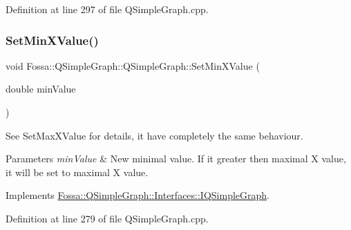 Definition at line 297 of file Q\+Simple\+Graph.\+cpp.

\mbox{\label{class_fossa_1_1_q_simple_graph_1_1_q_simple_graph_a0eef21e58d8c85f6083d73857f871639}} 
\subsubsection{\texorpdfstring{Set\+Min\+X\+Value()}{SetMinXValue()}}
{\footnotesize\ttfamily void Fossa\+::\+Q\+Simple\+Graph\+::\+Q\+Simple\+Graph\+::\+Set\+Min\+X\+Value (\begin{DoxyParamCaption}\item[{double}]{min\+Value }\end{DoxyParamCaption})\hspace{0.3cm}{\ttfamily [virtual]}}



See Set\+Max\+X\+Value for details, it have completely the same behaviour. 


\begin{DoxyParams}{Parameters}
{\em min\+Value} & New minimal value. If it greater then maximal X value, it will be set to maximal X value. \\
\hline
\end{DoxyParams}


Implements \hyperlink{class_fossa_1_1_q_simple_graph_1_1_interfaces_1_1_i_q_simple_graph_a4266725f87b306e572ad1ae37cfab4ef}{Fossa\+::\+Q\+Simple\+Graph\+::\+Interfaces\+::\+I\+Q\+Simple\+Graph}.



Definition at line 279 of file Q\+Simple\+Graph.\+cpp.

\mbox{\label{class_fossa_1_1_q_simple_graph_1_1_q_simple_graph_a8bf9aac5856a659eb89abffca7750df0}} 

